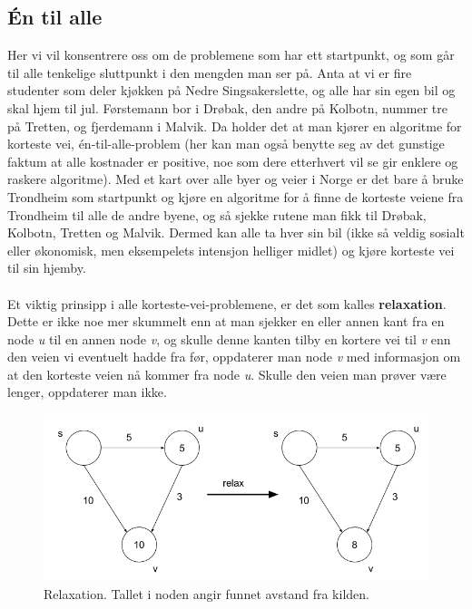 \subsection{Én til alle}
Her vi vil konsentrere oss om de problemene som har ett startpunkt, og som går til alle tenkelige sluttpunkt i den mengden man ser på. Anta at vi er fire studenter som deler kjøkken på Nedre Singsakerslette, og alle har sin egen bil og skal hjem til jul. Førstemann bor i Drøbak, den andre på Kolbotn, nummer tre på Tretten, og fjerdemann i Malvik. Da holder det at man kjører en algoritme for korteste vei, én-til-alle-problem (her kan man også benytte seg av det gunstige faktum at alle kostnader er positive, noe som dere etterhvert vil se gir enklere og raskere algoritme). Med et kart over alle byer og veier i Norge er det bare å bruke Trondheim som startpunkt og kjøre en algoritme for å finne de korteste veiene fra Trondheim til alle de andre byene, og så sjekke rutene man fikk til Drøbak, Kolbotn, Tretten og Malvik. Dermed kan alle ta hver sin bil (ikke så veldig sosialt eller økonomisk, men eksempelets intensjon helliger midlet) og kjøre korteste vei til sin hjemby. 
\\\\
Et viktig prinsipp i alle korteste-vei-problemene, er det som kalles \textbf{relaxation}. Dette er ikke noe mer skummelt enn at man sjekker en eller annen kant fra en node \textit{u} til en annen node \textit{v}, og skulle denne kanten tilby en kortere vei til \textit{v} enn den veien vi eventuelt hadde fra før, oppdaterer man node \textit{v} med informasjon om at den korteste veien nå kommer fra node \textit{u}. Skulle den veien man prøver være lenger, oppdaterer man ikke.

\begin{figure}[H]
\includegraphics[scale=0.5]{images/relaxation}
\centering %
\caption{Relaxation. Tallet i noden angir funnet avstand fra kilden.}
\label{fig:relaxation}
\end{figure}

